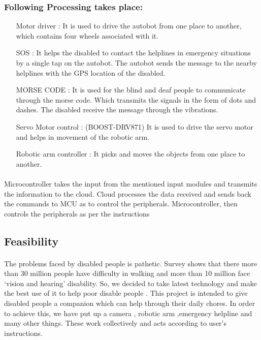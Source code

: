 \documentclass[12pt,a4paper]{article}
\begin{document}
	\subsubsection{Following Processing takes place:}
	\begin{itemize}
		\item[Motor driver]: It is used to drive the autobot from one place to another, which contains four wheels associated with it.
		\item[SOS]: It helps the disabled to contact the helplines in emergency situations by a single tap on the autobot. The autobot sends the message to the nearby helplines with the GPS location of the disabled.
		\item[MORSE CODE]: It is used for the blind and deaf people to communicate through the morse code. Which transmits the signals in the form of dots and dashes. The disabled receive the message through the vibrations.
		\item[Servo Motor control]: (BOOST-DRV871) It is used to drive the servo motor and helps in movement of the robotic arm.
		\item[Robotic arm controller]: It picks and moves the objects from one place to another.
	\end{itemize}
	\paragraph{}
	Microcontroller takes the input from the mentioned input modules and transmits the information to the cloud. Cloud processes the data received and sends back the commands to MCU as to control the peripherals. Microcontroller, then controls the peripherals as per the instructions
	\subsection{Feasibility}
	\paragraph{}
	The problems faced by disabled people is pathetic. Survey shows that there more than 30 million people have difficulty in walking and more than 10 million face ‘vision and hearing’ disability. So, we decided to take latest technology and make the best use of it to help poor disable people  . This project is intended to give disabled people a companion which can help through their daily chores. In order to achieve this, we have put up a camera , robotic arm ,emergency helpline and many other things. These work collectively and acts according to user’s instructions.
\end{document}

